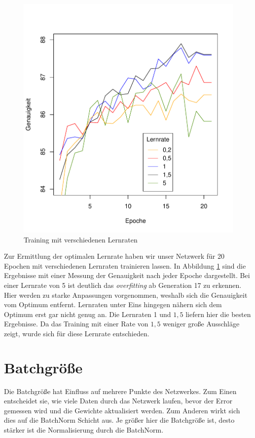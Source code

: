 \begin{figure}[H]
	\centering
	\includegraphics[scale=0.9]{./bilder/learningrate}
	\caption{Training mit verschiedenen Lernraten}
	\label{fig:learningrate}
\end{figure}
Zur Ermittlung der optimalen Lernrate haben wir unser Netzwerk für 20 Epochen mit verschiedenen Lernraten trainieren lassen. In Abbildung \ref{fig:learningrate} sind die Ergebnisse mit einer Messung der Genauigkeit nach jeder Epoche dargestellt. Bei einer Lernrate von 5 ist deutlich das \textit{overfitting} ab Generation 17 zu erkennen. Hier werden zu starke Anpassungen vorgenommen, weshalb sich die Genauigkeit vom Optimum entfernt. Lernraten unter Eins hingegen nähern sich dem Optimum erst gar nicht genug an. Die Lernraten 1 und $1,5$ liefern hier die besten Ergebnisse. Da das Training mit einer Rate von $1,5$ weniger große Ausschläge zeigt, wurde sich für diese Lernrate entschieden.
\section{Batchgröße}
Die Batchgröße hat Einfluss auf mehrere Punkte des Netzwerkes. Zum Einen entscheidet sie, wie viele Daten durch das Netzwerk laufen, bevor der Error gemessen wird und die Gewichte aktualisiert werden. Zum Anderen wirkt sich dies auf die BatchNorm Schicht aus. Je größer hier die Batchgröße ist, desto stärker ist die Normalisierung durch die BatchNorm.

